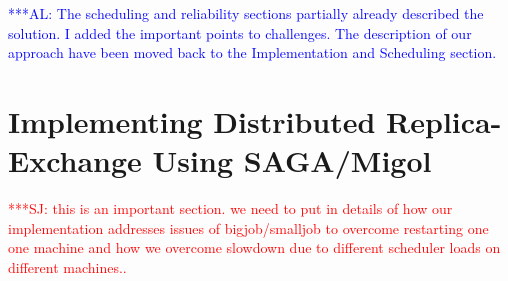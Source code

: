 \documentclass{rspublic}
\newcommand{\alnote}[1]{ {\textcolor{blue} { ***AL: #1 }}}
\newcommand{\jhanote}[1]{ {\textcolor{red} { ***SJ: #1 }}}
\newcommand{\alnote}[1]{}
\newcommand{\jhanote}[1]{}
\begin{document}
%                                   


\alnote{The scheduling and reliability sections partially already described the solution. 
I added the important points to challenges. The description of our approach have been 
moved back to the Implementation and Scheduling section.}
                         
\section{Implementing Distributed Replica-Exchange Using SAGA/Migol}
\label{sec:remd_impl}
\jhanote{this is an important section. we need to put in details of
  how our implementation addresses issues of bigjob/smalljob to
  overcome restarting one one machine and how we overcome slowdown due
  to different scheduler loads on different machines..}

\end{document}
